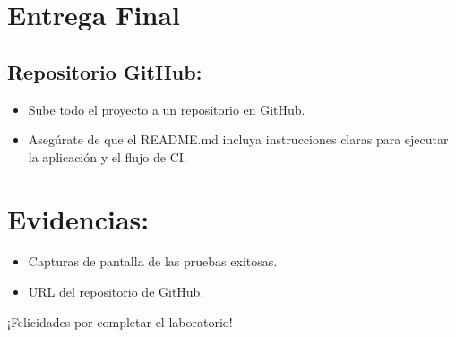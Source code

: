 \documentclass[
  a4paper,
  DIV=11,
  numbers=noendperiod,
  onepage,
  openany]{scrreprt}
\providecommand{\tightlist}{%
  \setlength{\itemsep}{0pt}\setlength{\parskip}{0pt}}\usepackage{longtable,booktabs,array}
\begin{document}
\section{Entrega Final}\label{entrega-final}

\subsection{Repositorio GitHub:}\label{repositorio-github}

\begin{itemize}
\tightlist
\item
  Sube todo el proyecto a un repositorio en GitHub.
\item
  Asegúrate de que el README.md incluya instrucciones claras para
  ejecutar la aplicación y el flujo de CI.
\end{itemize}

\section{Evidencias:}\label{evidencias}

\begin{itemize}
\tightlist
\item
  Capturas de pantalla de las pruebas exitosas.
\item
  URL del repositorio de GitHub.
\end{itemize}

¡Felicidades por completar el laboratorio! 🎉
\end{document}
